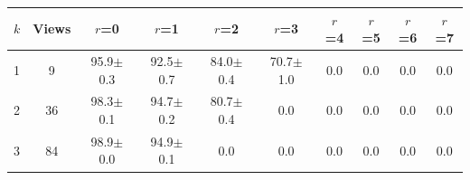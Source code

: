 \begin{tabular}{lccccccccc}
\toprule
$k$ & Views & $r$=0 & $r$=1 & $r$=2 & $r$=3 & $r$=4 & $r$=5 & $r$=6 & $r$=7 \\
\midrule
1 & 9 & 95.9$\pm$0.3 & 92.5$\pm$0.7 & 84.0$\pm$0.4 & 70.7$\pm$1.0 & 0.0 & 0.0 & 0.0 & 0.0 \\
2 & 36 & 98.3$\pm$0.1 & 94.7$\pm$0.2 & 80.7$\pm$0.4 & 0.0 & 0.0 & 0.0 & 0.0 & 0.0 \\
3 & 84 & 98.9$\pm$0.0 & 94.9$\pm$0.1 & 0.0 & 0.0 & 0.0 & 0.0 & 0.0 & 0.0 \\
\bottomrule
\end{tabular}